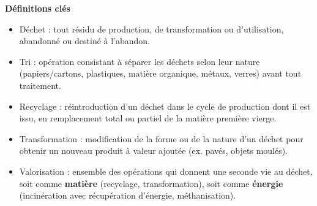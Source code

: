 \documentclass[11pt]{article}
\newcommand{\cle}[1]{{\popxbold\color{popdark}#1}}
\begin{document}
\begin{aretenir}
\textbf{Définitions clés}
\begin{itemize}
  \item \cle{Déchet} : tout résidu de production, de transformation ou d'utilisation, abandonné ou destiné à l'abandon.
  \item \cle{Tri} : opération consistant à séparer les déchets selon leur nature (papiers/cartons, plastiques, matière organique, métaux, verres) avant tout traitement.
  \item \cle{Recyclage} : réintroduction d'un déchet dans le cycle de production dont il est issu, en remplacement total ou partiel de la matière première vierge.
  \item \cle{Transformation} : modification de la forme ou de la nature d'un déchet pour obtenir un nouveau produit à valeur ajoutée (ex. pavés, objets moulés).
  \item \cle{Valorisation} : ensemble des opérations qui donnent une seconde vie au déchet, soit comme \textbf{matière} (recyclage, transformation), soit comme \textbf{énergie} (incinération avec récupération d'énergie, méthanisation).
\end{itemize}


\end{aretenir}
\end{document}
